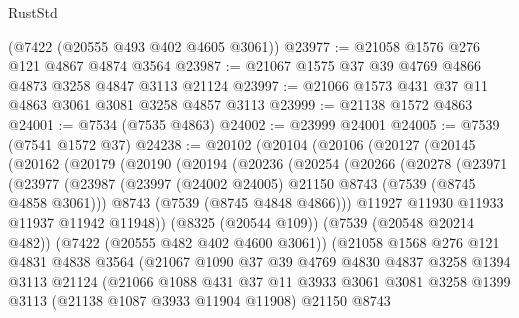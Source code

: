 \begin{lexlean}{RustStd}
\begin{coremodule}
    (@7422 (@20555 @493 @402 @4605 @3061))
@23977 := @21058 @1576 @276 @121 @4867 @4874 @3564
@23987 := @21067 @1575 @37 @39 @4769 @4866 @4873 @3258 @4847 @3113 @21124
@23997 := @21066 @1573 @431 @37 @11 @4863 @3061 @3081 @3258 @4857 @3113
@23999 := @21138 @1572 @4863
@24001 := @7534 (@7535 @4863)
@24002 := @23999 @24001
@24005 := @7539 (@7541 @1572 @37)
@24238 := @20102
    (@20104
      (@20106
        (@20127
          (@20145
            (@20162
              (@20179
                (@20190
                  (@20194
                    (@20236
                      (@20254
                        (@20266
                          (@20278
                            (@23971
                              (@23977
                                (@23987
                                  (@23997 (@24002 @24005) @21150 @8743 (@7539 (@8745 @4858 @3061)))
                                  @8743
                                  (@7539 (@8745 @4848 @4866)))
                                @11927
                                @11930
                                @11933
                                @11937
                                @11942
                                @11948))
                            (@8325 (@20544 @109))
                            (@7539 (@20548 @20214 @482))
                            (@7422 (@20555 @482 @402 @4600 @3061))
                            (@21058
                              @1568
                              @276
                              @121
                              @4831
                              @4838
                              @3564
                              (@21067
                                @1090
                                @37
                                @39
                                @4769
                                @4830
                                @4837
                                @3258
                                @1394
                                @3113
                                @21124
                                (@21066
                                  @1088
                                  @431
                                  @37
                                  @11
                                  @3933
                                  @3061
                                  @3081
                                  @3258
                                  @1399
                                  @3113
                                  (@21138 @1087 @3933 @11904 @11908)
                                  @21150
                                  @8743

\end{coremodule}
\end{lexlean}
